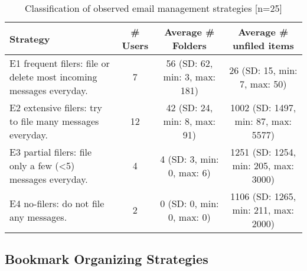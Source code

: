 \begin{table}[hbtp]
\begin{center}
\begin{footnotesize}
\setlength{\extrarowheight}{2pt}
\begin{tabular}{|p{4cm}|c|c|c|}
\hline
{\bf Strategy} & {\bf \# Users} & {\bf Average \# Folders} & {\bf Average \# unfiled items} \\
\hline
E1 frequent filers: file or delete most incoming messages everyday. &          7 & 56 (SD: 62, min: 3, max: 181)  & 26 (SD: 15, min: 7, max: 50) \\
\hline
E2 extensive filers: try to file many messages everyday.  &         12 & 42 (SD: 24, min: 8, max: 91) & 1002 (SD: 1497, min: 87, max: 5577) \\
\hline
E3 partial filers: file only a few (<5) messages everyday.  &          4 & 4 (SD: 3, min: 0, max: 6) & 1251 (SD: 1254, min: 205, max: 3000) \\
\hline
E4 no-filers: do not file any messages. &          2 & 0 (SD: 0, min: 0, max: 0) & 1106 (SD: 1265, min: 211, max: 2000) \\
\hline
\end{tabular}  

\end{footnotesize}
\caption{Classification of observed email management strategies [n=25]}
\label{table:exp-study:email_classification}
\end{center}
\end{table}
\normalsize



 





\subsection{Bookmark Organizing Strategies}
\label{exp-study:Results-org-strategies-bookmarks}

